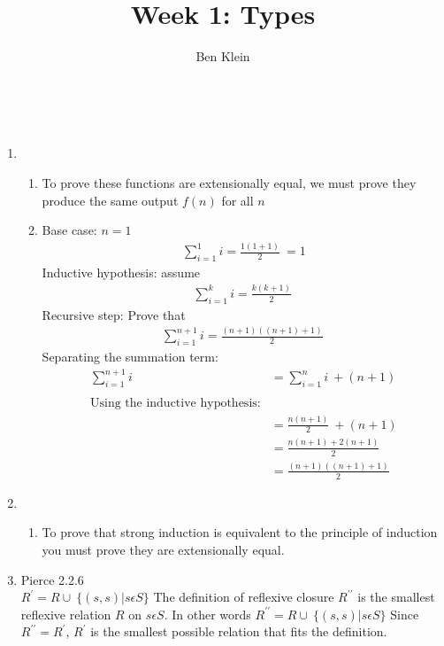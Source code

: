 \documentclass[]{article}
\title{Week 1: Types}
\author{Ben Klein}
\begin{document}
\maketitle

\textbf{}\\


\begin{flushleft}
\begin{enumerate}
	\item
	\begin{enumerate}
		\item To prove these functions are extensionally equal, we must prove they produce the same output $f(n)$ for all $n$
		\item Base case: $n=1$\\
		\begin{align*}
				\sum_{i=1}^{1} i = \frac{1(1+1)}{2}\ =1
		\end{align*}
		Inductive hypothesis: assume
		\begin{align*}
			\sum_{i=1}^{k} i = \frac{k(k+1)}{2}\
		\end{align*}
		Recursive step: Prove that\\
		\begin{align*}
			\sum_{i=1}^{n+1} i = \frac{(n+1)((n+1)+1)}{2}\
		\end{align*}
		Separating the summation term:
		\begin{align*}
			\sum_{i=1}^{n+1} i &= \sum_{i=1}^{n} i\ + (n+1) \\\\
			\text{Using the inductive hypothesis:}\\
			&= \frac{n(n+1)}{2}\ + (n+1)\\
			&= \frac{n(n+1) + 2(n+1)}{2}\\
			&= \frac{(n+1)((n+1)+1)}{2}\
		\end{align*}
	\end{enumerate}
\item 
\begin{enumerate}
	\item To prove that strong induction is equivalent to the principle of induction you must prove they are extensionally equal.
\end{enumerate}
\item Pierce 2.2.6\\
$R^\prime = R \cup\ \{(s,s)|s\epsilon S \}$
The definition of reflexive closure $R^{\prime \prime}$ is the smallest reflexive relation $R$ on $s\epsilon S$.
In other words $R^{\prime \prime} = R \cup\ \{(s,s)|s\epsilon S \}$ Since $R^{\prime \prime} = R^{\prime}$, $R^{\prime}$ is the smallest possible relation that fits the definition.

\end{enumerate}
\end{flushleft}
\end{document}
